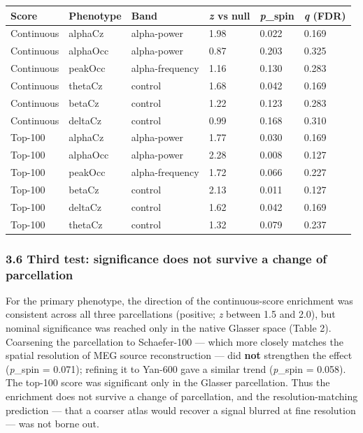\documentclass[
  11pt,
  letterpaper,
]{article}
\newcounter{none} %
\begin{document}
{\def\LTcaptype{none} %
\begin{longtable}[]{@{}llllll@{}}
\toprule\noalign{}
Score & Phenotype & Band & \emph{z} vs null & \emph{p}\_spin & \emph{q}
(FDR) \\
\midrule\noalign{}
\endhead
\bottomrule\noalign{}
\endlastfoot
Continuous & alphaCz & alpha-power & 1.98 & 0.022 & 0.169 \\
Continuous & alphaOcc & alpha-power & 0.87 & 0.203 & 0.325 \\
Continuous & peakOcc & alpha-frequency & 1.16 & 0.130 & 0.283 \\
Continuous & thetaCz & control & 1.68 & 0.042 & 0.169 \\
Continuous & betaCz & control & 1.22 & 0.123 & 0.283 \\
Continuous & deltaCz & control & 0.99 & 0.168 & 0.310 \\
Top-100 & alphaCz & alpha-power & 1.77 & 0.030 & 0.169 \\
Top-100 & alphaOcc & alpha-power & 2.28 & 0.008 & 0.127 \\
Top-100 & peakOcc & alpha-frequency & 1.72 & 0.066 & 0.227 \\
Top-100 & betaCz & control & 2.13 & 0.011 & 0.127 \\
Top-100 & deltaCz & control & 1.62 & 0.042 & 0.169 \\
Top-100 & thetaCz & control & 1.32 & 0.079 & 0.237 \\
\end{longtable}
}

\subsubsection{3.6 Third test: significance does not survive a change of
parcellation}\label{third-test-significance-does-not-survive-a-change-of-parcellation}

For the primary phenotype, the direction of the continuous-score
enrichment was consistent across all three parcellations (positive;
\emph{z} between 1.5 and 2.0), but nominal significance was reached only
in the native Glasser space (Table 2). Coarsening the parcellation to
Schaefer-100 --- which more closely matches the spatial resolution of
MEG source reconstruction --- did \textbf{not} strengthen the effect
(\emph{p}\_spin = 0.071); refining it to Yan-600 gave a similar trend
(\emph{p}\_spin = 0.058). The top-100 score was significant only in the
Glasser parcellation. Thus the enrichment does not survive a change of
parcellation, and the resolution-matching prediction --- that a coarser
atlas would recover a signal blurred at fine resolution --- was not
borne out.
\end{document}
